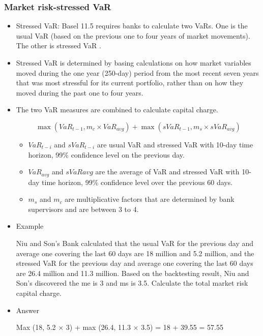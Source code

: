 \subsubsection{Market risk-stressed VaR}
\begin{itemize}
\item Stressed VaR: Basel 11.5 requires banks to calculate two VaRs. One is the usual VaR (based on the previous one to four years of market movements). The other is stressed VaR .
\item Stressed VaR is determined by basing calculations on how market variables moved during the one year (250-day) period from the most recent seven years that was most stressful for its current portfolio, rather than on how they moved during the past one to four years.
\item The two VaR measures are combined to calculate capital charge.

    \begin{equation}
    \max\left(VaR_{t-1}, m_c \times VaR_{avg}\right) + \max\left(sVaR_{t-1}, m_s \times sVaR_{avg}\right)
    \end{equation}

    \begin{itemize}
        \item $VaR_{t-i}$ and $sVaR_{t-i}$ are usual VaR and stressed VaR with 10-day time horizon, 99\% confidence level on the previous day.
        \item $VaR_{avg}$ and $sVaR{avg}$ are the average of VaR and stressed VaR with 10-day time horizon, 99\% confidence level over the previous 60 days.
        \item $m_s$ and $m_c$ are multiplicative factors that are determined by bank supervisors and are between 3 to 4.
        \end{itemize}
\item Example

Niu and Son's Bank calculated that the usual VaR for the previous day and average one covering the last 60 days are 18 million and 5.2 million, and the stressed VaR for the previous day and average one covering the last 60 days are 26.4 million and 11.3 million. Based on the backtesting result, Niu and Son's discovered the me is 3 and ms is 3.5. Calculate the total market risk capital charge.

\item Answer

Max (18, 5.2 × 3) + max (26.4, 11.3 × 3.5) = 18 + 39.55 = 57.55

\end{itemize}



